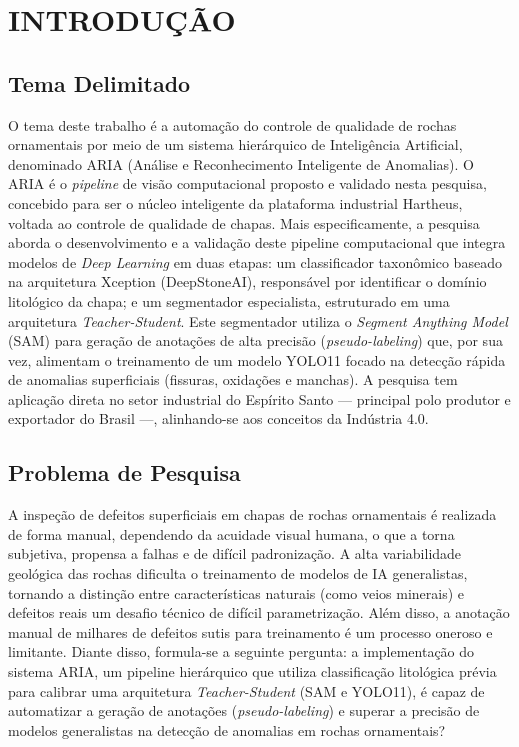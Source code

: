 \chapter[INTRODUÇÃO]{INTRODUÇÃO}

\section{Tema Delimitado}
O tema deste trabalho é a automação do controle de qualidade de rochas ornamentais por meio de um sistema hierárquico de Inteligência Artificial, denominado ARIA (Análise e Reconhecimento Inteligente de Anomalias). O ARIA é o \textit{pipeline} de visão computacional proposto e validado nesta pesquisa, concebido para ser o núcleo inteligente da plataforma industrial Hartheus, voltada ao controle de qualidade de chapas. Mais especificamente, a pesquisa aborda o desenvolvimento e a validação deste pipeline computacional que integra modelos de \textit{Deep Learning} em duas etapas: um classificador taxonômico baseado na arquitetura Xception (DeepStoneAI), responsável por identificar o domínio litológico da chapa; e um segmentador especialista, estruturado em uma arquitetura \textit{Teacher-Student}. Este segmentador utiliza o \textit{Segment Anything Model} (SAM) para geração de anotações de alta precisão (\textit{pseudo-labeling}) que, por sua vez, alimentam o treinamento de um modelo YOLO11 focado na detecção rápida de anomalias superficiais (fissuras, oxidações e manchas). A pesquisa tem aplicação direta no setor industrial do Espírito Santo — principal polo produtor e exportador do Brasil —, alinhando-se aos conceitos da Indústria 4.0.

\section{Problema de Pesquisa}
A inspeção de defeitos superficiais em chapas de rochas ornamentais é realizada de forma manual, dependendo da acuidade visual humana, o que a torna subjetiva, propensa a falhas e de difícil padronização. A alta variabilidade geológica das rochas dificulta o treinamento de modelos de IA generalistas, tornando a distinção entre características naturais (como veios minerais) e defeitos reais um desafio técnico de difícil parametrização. Além disso, a anotação manual de milhares de defeitos sutis para treinamento é um processo oneroso e limitante. Diante disso, formula-se a seguinte pergunta: a implementação do sistema ARIA, um pipeline hierárquico que utiliza classificação litológica prévia para calibrar uma arquitetura \textit{Teacher-Student} (SAM e YOLO11), é capaz de automatizar a geração de anotações (\textit{pseudo-labeling}) e superar a precisão de modelos generalistas na detecção de anomalias em rochas ornamentais?

